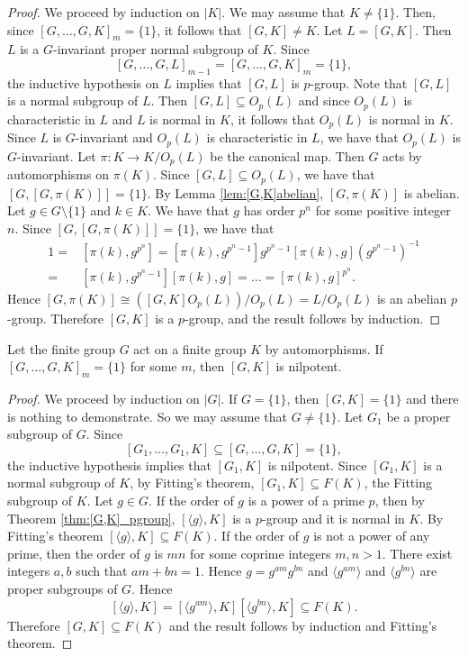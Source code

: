\begin{proof}
	We proceed by induction on $|K|$. We may assume that $K\ne\{1\}$. Then, since $[G,\dots,G,K]_m=\{1\}$, 
	it follows that $[G,K]\ne K$. Let $L=[G,K]$. Then $L$ is a $G$-invariant proper 
	normal subgroup of $K$. Since 
	\[
	[G,\dots,G,L]_{m-1}= [G,\dots,G,K]_m=\{1\},
	\]
	the inductive hypothesis on $L$ implies that $[G,L]$ is $p$-group. 
	Note that $[G,L]$ is a normal subgroup of $L$. Then $[G,L]\subseteq O_p(L)$ and since $O_p(L)$ is characteristic in $L$
	and $L$ is normal in $K$, it follows
	that $O_p(L)$ is normal in $K$. Since $L$ is $G$-invariant and $O_p(L)$ is characteristic in $L$, we have that $O_p(L)$ is $G$-invariant. Let $\pi\colon K\to K/O_p(L)$ be the canonical map. Then $G$ acts by automorphisms on $\pi(K)$.  Since $[G,L]\subseteq O_p(L)$, we have that $[G,[G,\pi(K)]]=\{ 1\}$. By Lemma \ref{lem:[G,K]abelian}, $[G,\pi(K)]$ is abelian. Let $g\in G\setminus \{ 1\}$ and $k\in K$. We have that $g$ has order $p^n$ for some positive integer $n$. Since $[G,[G,\pi(K)]]=\{ 1\}$, we have that
	\begin{align*} 1=&[\pi(k),g^{p^n}]=[\pi(k),g^{p^n-1}]g^{p^n-1}[\pi(k),g](g^{p^n-1})^{-1}\\
	=&[\pi(k),g^{p^n-1}][\pi(k),g]=\dots =[\pi(k),g]^{p^n}.
	\end{align*}
	Hence $[G,\pi(K)]\cong ([G,K]O_p(L))/O_p(L)=L/O_p(L)$ is an abelian $p$-group. Therefore $[G,K]$ is a $p$-group, and the result follows by induction.
	\end{proof}

\begin{theorem}\label{thm:general[G,K]nilpotent}
	Let the finite group $G$ act on a finite group $K$ by automorphisms. 
	If $[G,\dots,G,K]_m=\{1\}$ for some $m$, then
	$[G,K]$ is nilpotent. 
\end{theorem}

\begin{proof}
	We proceed by induction on $|G|$. If $G=\{1\}$, then $[G,K]=\{1\}$ and there is nothing to demonstrate. So we may assume 
	that $G\ne\{1\}$. Let $G_1$ be a proper subgroup of $G$. Since 
	\[
	[G_1,\dots,G_1,K]\subseteq [G,\dots,G,K]=\{1\},
	\]
	the inductive hypothesis implies that $[G_1,K]$ is nilpotent. Since $[G_1,K]$ is a normal subgroup of $K$, by Fitting's theorem,
	$[G_1,K]\subseteq F(K)$, the Fitting subgroup of $K$. Let $g\in G$. If the order of $g$ is a power of a prime $p$, then by Theorem \ref{thm:[G,K]_pgroup}, $[\langle g\rangle,K]$ is a $p$-group and it is normal in $K$. By Fitting's theorem $[\langle g\rangle, K]\subseteq F(K)$. If the order of $g$ is not a power of any prime, then the order of $g$ is $mn$ for some coprime integers $m,n>1$. There exist integers $a,b$ such that $am+bn=1$. Hence $g=g^{am}g^{bn}$ and  $\langle g^{am}\rangle$ and $\langle g^{bn}\rangle$ are proper subgroups of $G$. Hence 
	\[ [\langle g\rangle, K]=[\langle g^{am}\rangle, K][\langle g^{bn}\rangle ,K]\subseteq F(K).\]
	Therefore $[G,K]\subseteq F(K)$ and the result follows by induction and Fitting's theorem.
\end{proof}

